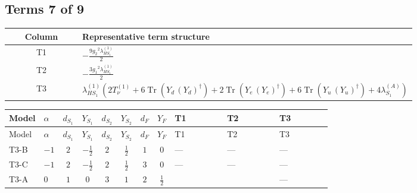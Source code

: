 \documentclass[8pt]{article}
\begin{document}
\begin{landscape}
\subsection*{Terms 7 of 9}
\begin{center}
\begin{tabular}{@{}c >{\raggedright\arraybackslash}p{0.82\linewidth}@{}}
\toprule
Column & Representative term structure \\
\midrule
T1 & \(\displaystyle -\frac{9 {g_2}^2 {\lambda_{HS_1}^{(1)}}}{2}\) \\
\midrule
T2 & \(\displaystyle -\frac{3 {g_1}^2 {\lambda_{HS_1}^{(1)}}}{2}\) \\
\midrule
T3 & \(\displaystyle {\lambda_{HS_1}^{(1)}} (2 T_{\nu}^{(1)}+6 \operatorname{Tr}\!\left({Y_d}\,\left({Y_d}\right)^{\dagger}\right)+2 \operatorname{Tr}\!\left({Y_e}\,\left({Y_e}\right)^{\dagger}\right)+6 \operatorname{Tr}\!\left({Y_u}\,\left({Y_u}\right)^{\dagger}\right)+4 {\lambda_{S_1}^{(A)}})\) \\
\midrule
\bottomrule
\end{tabular}
\end{center}
\smallskip
\tiny
\begin{longtable}{@{}llcccccc >{\raggedright\arraybackslash}p{0.21\linewidth} >{\raggedright\arraybackslash}p{0.21\linewidth} >{\raggedright\arraybackslash}p{0.21\linewidth}@{}}
\toprule
Model & $\alpha$ & $d_{S_1}$ & $Y_{S_1}$ & $d_{S_2}$ & $Y_{S_2}$ & $d_F$ & $Y_F$ & T1 & T2 & T3 \\
\midrule
\endfirsthead
\toprule
Model & $\alpha$ & $d_{S_1}$ & $Y_{S_1}$ & $d_{S_2}$ & $Y_{S_2}$ & $d_F$ & $Y_F$ & T1 & T2 & T3 \\
\midrule
\endhead
T3-B & $-1$ & $2$ & $-\frac{1}{2}$ & $2$ & $\frac{1}{2}$ & $1$ & $0$ & --- & --- & --- \\
\midrule
T3-C & $-1$ & $2$ & $-\frac{1}{2}$ & $2$ & $\frac{1}{2}$ & $3$ & $0$ & --- & --- & --- \\
\midrule
T3-A & $0$ & $1$ & $0$ & $3$ & $1$ & $2$ & $\frac{1}{2}$ & \scriptsize\adjustbox{max width=\linewidth}{$\begin{gathered} -\frac{9 {g_2}^2 {\lambda_{HS_1}^{(1)}}}{2}\end{gathered}$} & \scriptsize\adjustbox{max width=\linewidth}{$\begin{gathered} -\frac{3 {g_1}^2 {\lambda_{HS_1}^{(1)}}}{2}\end{gathered}$} & --- \\
\midrule

\end{longtable}
\end{landscape}
\end{document}
